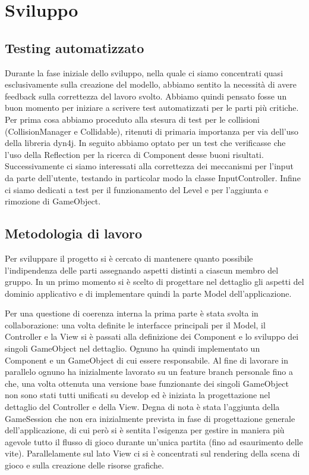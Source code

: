 \documentclass[a4paper,12pt]{report}
\begin{document}
\chapter{Sviluppo}

\section{Testing automatizzato}
Durante la fase iniziale dello sviluppo, nella quale ci siamo concentrati quasi esclusivamente sulla creazione del modello, abbiamo sentito la necessità di avere feedback sulla correttezza del lavoro svolto.
Abbiamo quindi pensato fosse un buon momento per iniziare a scrivere test automatizzati per le parti più critiche.
Per prima cosa abbiamo proceduto alla stesura di test per le collisioni (CollisionManager e Collidable), ritenuti di primaria importanza per via dell'uso della libreria dyn4j.
In seguito abbiamo optato per un test che verificasse che l'uso della Reflection per la ricerca di Component desse buoni risultati.
Successivamente ci siamo interessati alla correttezza dei meccanismi per l'input da parte dell'utente, testando in particolar modo la classe InputController.
Infine ci siamo dedicati a test per il funzionamento del Level e per l'aggiunta e rimozione di GameObject.

\section{Metodologia di lavoro}
Per sviluppare il progetto si è cercato di mantenere quanto possibile l'indipendenza delle parti assegnando aspetti distinti a ciascun membro del gruppo.
In un primo momento si è scelto di progettare nel dettaglio gli aspetti del dominio applicativo e di implementare quindi la parte Model dell'applicazione. 

Per una questione di coerenza interna la prima parte è stata svolta in collaborazione: una volta definite le interfacce principali per il Model, il Controller e la View si è passati alla definizione dei Component e lo sviluppo dei singoli GameObject nel dettaglio.
Ognuno ha quindi implementato un Component e un GameObject di cui essere responsabile.
Al fine di lavorare in parallelo ognuno ha inizialmente lavorato su un feature branch personale fino a che, una volta ottenuta una versione base funzionante dei singoli GameObject non sono stati tutti unificati su develop ed è iniziata la progettazione nel dettaglio del Controller e della View.
Degna di nota è stata l'aggiunta della GameSession che non era inizialmente prevista in fase di progettazione generale dell'applicazione, di cui però si è sentita l'esigenza per gestire in maniera più agevole tutto il flusso di gioco durante un'unica partita (fino ad esaurimento delle vite).
Parallelamente sul lato View ci si è concentrati sul rendering della scena di gioco e sulla creazione delle risorse grafiche.
\end{document}
